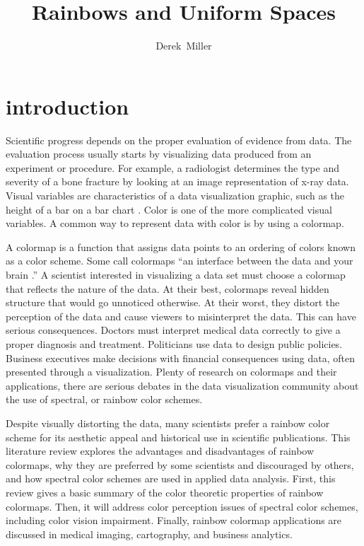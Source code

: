 \documentclass[journal]{IEEEtran}
\begin{document}
\title{Rainbows and Uniform Spaces}
\author{Derek~Miller}%
\maketitle


\begin{abstract}
\blindtext[1]
\end{abstract}

\IEEEpeerreviewmaketitle



\section{introduction}
Scientific progress depends on the proper evaluation
of evidence from data. The evaluation process usually
starts by visualizing data produced from an experiment
or procedure. For example, a radiologist determines the
type and severity of a bone fracture by looking at an
image representation of x-ray data. Visual variables are
characteristics of a data visualization graphic, such as
the height of a bar on a bar chart 
\cite{visvars, colorchoice, colorguidelines}.
Color is one of the more complicated visual variables. 
A common way to represent data with color is by using a colormap.
\par
A colormap is a function that assigns data points to
an ordering of colors known as a color scheme. Some
call colormaps “an interface between the data and your
brain \cite{viridis}.” A scientist interested in visualizing a
data set must choose a colormap that reflects the nature of the data. 
At their best, colormaps reveal hidden structure that would go unnoticed otherwise. At their worst, they distort the perception of the data and
cause viewers to misinterpret the data. This can have
serious consequences. Doctors must interpret medical
data correctly to give a proper diagnosis and treatment.
Politicians use data to design public policies. Business
executives make decisions with financial consequences using data, often presented through a visualization.
Plenty of research on colormaps and
their applications, there are serious debates in the data
visualization community about the use of spectral, or
rainbow color schemes.
\par
Despite visually distorting the data, many scientists
prefer a rainbow color scheme for its aesthetic appeal
and historical use in scientific publications. This literature review explores the advantages and disadvantages
of rainbow colormaps, why they are preferred by some
scientists and discouraged by others, and how spectral color schemes are used
in applied data analysis. First, this review gives a basic summary 
of the color theoretic properties of rainbow colormaps. Then, it will address color perception issues of spectral color schemes, including color vision impairment. Finally, rainbow colormap applications are discussed in medical imaging, cartography, and business analytics.
\end{document}
